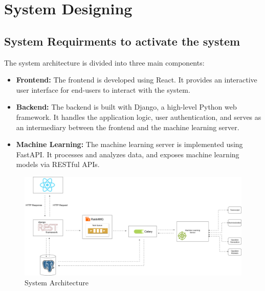 \chapter{System Designing}

\section{System Requirments to activate the system}

The system architecture is divided into three main components:

\begin{itemize}
    \item \textbf{Frontend:} The frontend is developed using React. It provides an interactive user interface for end-users to interact with the system.
    \item \textbf{Backend:} The backend is built with Django, a high-level Python web framework. It handles the application logic, user authentication, and serves as an intermediary between the frontend and the machine learning server.
    \item \textbf{Machine Learning:} The machine learning server is implemented using FastAPI. It processes and analyzes data, and exposes machine learning models via RESTful APIs.
\end{itemize}

\begin{figure}[h!]
	\centering
	\includegraphics[max height=\textheight,max width=\textwidth]{figures/nerualearn.jpg}
	\caption{System Architecture}
\end{figure}

